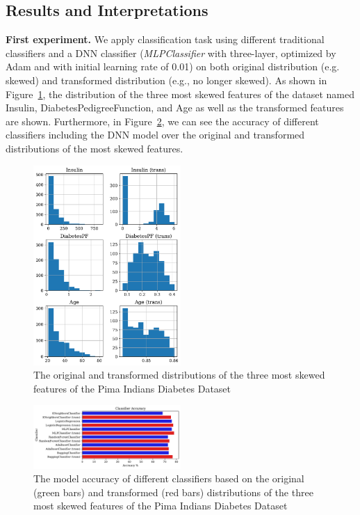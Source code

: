 \subsection{Results and Interpretations}
\vspace {.2cm}
\noindent
\textbf{First experiment.}
We apply classification task using different traditional classifiers  and a DNN classifier (\emph{MLPClassifier} with three-layer, optimized by Adam and with initial learning rate of 0.01) on both original distribution (e.g. skewed) and transformed distribution (e.g., no longer skewed). 
As shown in Figure~\ref{skew_dist}, the distribution of the three most skewed features of the dataset named Insulin, DiabetesPedigreeFunction, and Age as well as the transformed features are shown. Furthermore, in Figure~\ref{skew_acc}, we can see the accuracy of different classifiers including the DNN model over the original and transformed distributions of the most skewed features.
\begin{figure}[!t]  %
	\centering
	\includegraphics[width=0.5\textwidth]{figures/dist.pdf}
	\vspace{-0.7cm}
	\caption{The original and transformed distributions of the three most skewed features of the Pima Indians Diabetes Dataset}
	\label{skew_dist}
\end{figure}
\begin{figure}[!t]  %
	\centering
	\includegraphics[width=0.5\textwidth]{figures/classifiers.pdf}
	\vspace{-0.7cm}
	\caption{The model accuracy of different classifiers based on the original (green bars) and transformed (red bars) distributions of the three most skewed features of the Pima Indians Diabetes Dataset}
	\label{skew_acc}
\end{figure}
